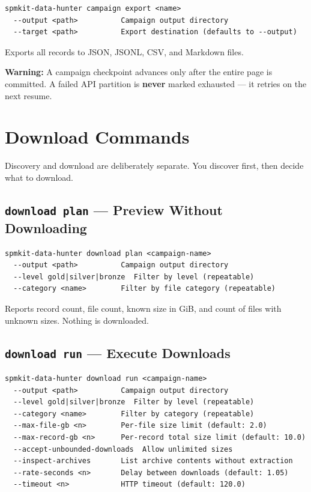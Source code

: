 \documentclass[11pt,a4paper]{article}
\begin{document}
\begin{lstlisting}
spmkit-data-hunter campaign export <name>
  --output <path>          Campaign output directory
  --target <path>          Export destination (defaults to --output)
\end{lstlisting}

Exports all records to JSON, JSONL, CSV, and Markdown files.

\bigskip
\begin{warnbox}
\textbf{Warning:} A campaign checkpoint advances only after the entire page is committed. A failed API partition is \textbf{never} marked exhausted --- it retries on the next resume.
\end{warnbox}

\section{Download Commands}

Discovery and download are deliberately separate. You discover first, then decide what to download.

\subsection{\texttt{download plan} --- Preview Without Downloading}

\begin{lstlisting}
spmkit-data-hunter download plan <campaign-name>
  --output <path>          Campaign output directory
  --level gold|silver|bronze  Filter by level (repeatable)
  --category <name>        Filter by file category (repeatable)
\end{lstlisting}

Reports record count, file count, known size in GiB, and count of files with unknown sizes. Nothing is downloaded.

\newpage

\subsection{\texttt{download run} --- Execute Downloads}

\begin{lstlisting}
spmkit-data-hunter download run <campaign-name>
  --output <path>          Campaign output directory
  --level gold|silver|bronze  Filter by level (repeatable)
  --category <name>        Filter by category (repeatable)
  --max-file-gb <n>        Per-file size limit (default: 2.0)
  --max-record-gb <n>      Per-record total size limit (default: 10.0)
  --accept-unbounded-downloads  Allow unlimited sizes
  --inspect-archives       List archive contents without extraction
  --rate-seconds <n>       Delay between downloads (default: 1.05)
  --timeout <n>            HTTP timeout (default: 120.0)
\end{lstlisting}
\end{document}
